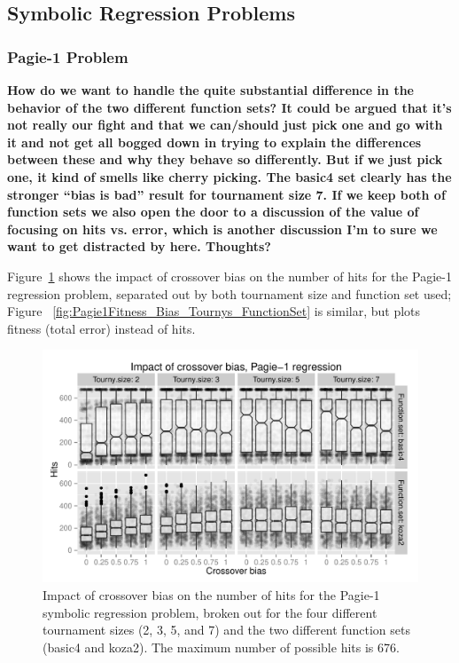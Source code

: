 \documentclass{sig-alternate}
\begin{document}
\subsection{Symbolic Regression Problems}

\subsubsection{Pagie-1 Problem}

\textbf{How do we want to handle the quite substantial difference in the behavior of the two different function sets? It 
could be argued that it's not really our fight and that we can/should just pick one and go with it and not get all bogged 
down in trying to explain the differences between these and why they behave so differently. But if we just pick one, it 
kind of smells like cherry picking. The basic4 set clearly has the stronger ``bias is bad'' result for tournament size 7. If 
we keep both of function sets we also open the door to a discussion of the value of focusing on hits vs. error, which is 
another discussion I'm to sure we want to get distracted by here. Thoughts?}

Figure~\ref{fig:Pagie1Hits_Bias_Tournys_FunctionSet} shows the impact of crossover bias on the number of hits for 
the Pagie-1 regression problem, separated out by both tournament size and function set used; Figure~
\ref{fig:Pagie1Fitness_Bias_Tournys_FunctionSet} is similar, but plots fitness (total error) instead of hits.

\begin{figure}
\centering
\includegraphics[width=0.45 \textwidth]{Plots/Pagie_1_Hits_vs_Bias_Tournys_FunctionSet.pdf}
\caption{Impact of crossover bias on the number of hits for the Pagie-1 symbolic regression problem, broken out for 
the four different tournament sizes (2, 3, 5, and 7) and the two different function sets (basic4 and koza2). The 
maximum number of possible hits is 676.}
\label{fig:Pagie1Hits_Bias_Tournys_FunctionSet}
\end{figure}
\end{document}
